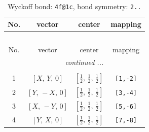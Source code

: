 \documentclass[fleqn,8pt]{jsarticle}
\begin{document}
\renewcommand{\arraystretch}{1.2}
\begin{longtable}{cccc}
\caption{Wyckoff bond: {\tt 4f@1c}, bond symmetry: {\tt 2..}}
 \\
 \hline \hline
No. & vector & center & mapping \\ \hline \endfirsthead

\multicolumn{3}{l}{\tablename\ \thetable{}} \\
 \hline \hline
No. & vector & center & mapping \\ \hline \endhead

 \hline \hline
\multicolumn{3}{r}{\footnotesize\it continued ...} \\ \endfoot

 \hline \hline
\multicolumn{3}{r}{} \\ \endlastfoot

1 & $\left[ X,\, Y,\, 0 \right]$ & $\left[ \frac{1}{2},\, \frac{1}{2},\, \frac{1}{2} \right]$ & {\tt [1,-2]} \\ \hline
2 & $\left[ Y,\, - X,\, 0 \right]$ & $\left[ \frac{1}{2},\, \frac{1}{2},\, \frac{1}{2} \right]$ & {\tt [3,-4]} \\ \hline
3 & $\left[ X,\, - Y,\, 0 \right]$ & $\left[ \frac{1}{2},\, \frac{1}{2},\, \frac{1}{2} \right]$ & {\tt [5,-6]} \\ \hline
4 & $\left[ Y,\, X,\, 0 \right]$ & $\left[ \frac{1}{2},\, \frac{1}{2},\, \frac{1}{2} \right]$ & {\tt [7,-8]} \\
\end{longtable}
\renewcommand{\arraystretch}{1.2}
\end{document}
